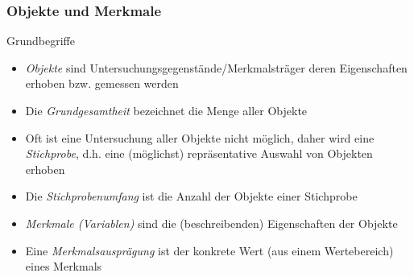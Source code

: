 
\begin{frame}
\frametitle{Objekte und Merkmale}
\begin{block}{Grundbegriffe}
\begin{itemize}
\pause
\item \textit{Objekte} sind Untersuchungsgegenstände/Merkmalsträger deren Eigenschaften erhoben bzw. gemessen werden
\pause
\item Die \textit{Grundgesamtheit} bezeichnet die Menge aller Objekte
\pause
\item Oft ist eine Untersuchung aller Objekte nicht möglich, daher wird eine \textit{Stichprobe}, d.h. eine (möglichst) repräsentative Auswahl von Objekten erhoben
\pause
\item Die \textit{Stichprobenumfang} ist die Anzahl der Objekte einer Stichprobe
\pause
\item \textit{Merkmale (Variablen)} sind die (beschreibenden) Eigenschaften der Objekte
\pause
\item Eine \textit{Merkmalsausprägung} ist der konkrete Wert (aus einem Wertebereich) eines Merkmals
\end{itemize}
\end{block}
\end{frame}


